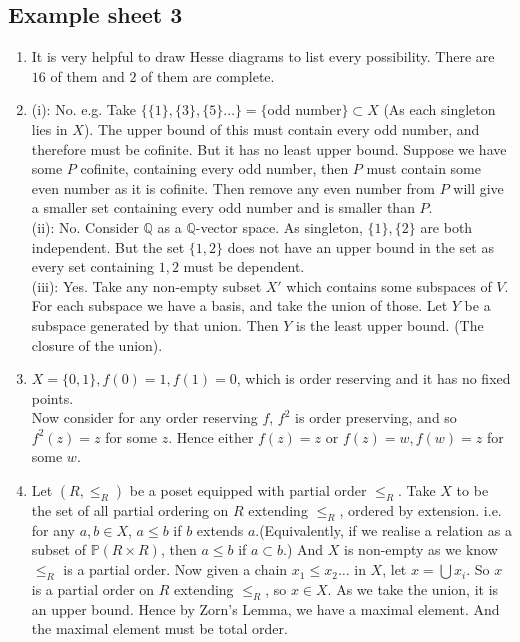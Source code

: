 \subsection{Example sheet 3}
\begin{enumerate}
\item It is very helpful to draw Hesse diagrams to list every possibility. There are $16$ of them and $2$ of them are complete.\\
\item (i): No. e.g. Take $\{\{1\},\{3\},\{5\} \ldots\}=\{$odd number$\} \subset X$ (As each singleton lies in $X$). The upper bound of this must contain every odd number, and therefore must be cofinite. But it has no least upper bound. Suppose we have some $P$ cofinite, containing every odd number, then $P$ must contain some even number as it is cofinite. Then remove any even number from $P$ will give a smaller set containing every odd number and is smaller than $P$.\\
    (ii): No. Consider $\mathbb{Q}$ as a $\mathbb{Q}$-vector space. As singleton, $\{1\}, \{2\}$ are both independent. But the set $\{1,2\}$ does not have an upper bound in the set as every set containing $1,2$ must be dependent.\\
    (iii): Yes. Take any non-empty subset $X'$ which contains some subspaces of $V$. For each subspace we have a basis, and take the union of those. Let $Y$ be a subspace generated by that union. Then $Y$ is the least upper bound. (The closure of the union).\\
\item $X=\{0,1\}, f(0)=1,f(1)=0$, which is order reserving and it has no fixed points.\\
     Now consider for any order reserving $f$, $f^2$ is order preserving, and so $f^2(z)=z$ for some $z$. Hence either $f(z)=z$ or $f(z)=w, f(w)=z$ for some $w$.\\
\item Let $(R,\le_R)$ be a poset equipped with partial order $\le_R$. Take $X$ to be the set of all  partial ordering on $R$ extending $\le_R$, ordered by extension. i.e. for any $a,b \in X$, $a \le b$ if $b$ extends $a$.(Equivalently, if we realise a relation as a subset of $\mathbb{P}(R \times R)$, then $a \le b$ if $a \subset b$.) And $X$ is non-empty as we know $\le_R$ is a partial order.
    Now given a chain $x_1 \le x_2 \ldots$ in $X$, let $x=\bigcup x_i$. So $x$ is a partial order on $R$ extending $\le_R$, so $x \in X$. As we take the union, it is an upper bound. Hence by Zorn's Lemma, we have a maximal element. And the maximal element must be total order.\\

\end{enumerate}
